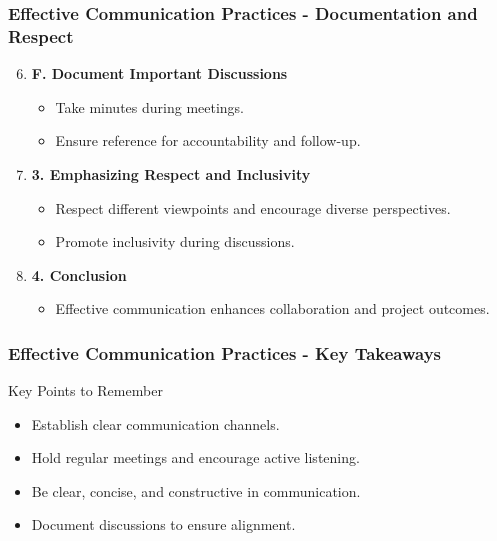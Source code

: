\documentclass[aspectratio=169]{beamer}
\begin{document}
\begin{frame}[fragile]
    \frametitle{Effective Communication Practices - Documentation and Respect}
    \begin{enumerate}
        \setcounter{enumi}{5} %
        \item \textbf{F. Document Important Discussions}
            \begin{itemize}
                \item Take minutes during meetings. 
                \item Ensure reference for accountability and follow-up.
            \end{itemize}
        
        \item \textbf{3. Emphasizing Respect and Inclusivity}
            \begin{itemize}
                \item Respect different viewpoints and encourage diverse perspectives.
                \item Promote inclusivity during discussions.
            \end{itemize}
        
        \item \textbf{4. Conclusion}
            \begin{itemize}
                \item Effective communication enhances collaboration and project outcomes.
            \end{itemize}
    \end{enumerate}
\end{frame}

\begin{frame}[fragile]
    \frametitle{Effective Communication Practices - Key Takeaways}
    \begin{block}{Key Points to Remember}
        \begin{itemize}
            \item Establish clear communication channels.
            \item Hold regular meetings and encourage active listening.
            \item Be clear, concise, and constructive in communication.
            \item Document discussions to ensure alignment.
        \end{itemize}
    \end{block}
\end{frame}
\end{document}
